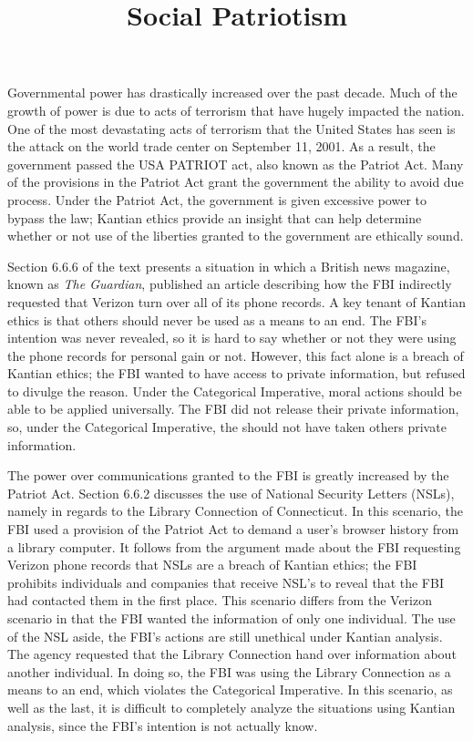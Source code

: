\documentclass{paper}
\title{Social Patriotism}
\begin{document}
\drafth{}
\inlinetitle
\begin{linenumbers}

Governmental power has drastically increased over the past decade. Much of the growth of power is due to acts of terrorism that have hugely impacted the nation. One of the most devastating acts of terrorism that the United States has seen is the attack on the world trade center on September 11, 2001. As a result, the government passed the USA PATRIOT act, also known as the Patriot Act. Many of the provisions in the Patriot Act grant the government the ability to avoid due process. Under the Patriot Act, the government is given excessive power to bypass the law; Kantian ethics provide an insight that can help determine whether or not use of the liberties granted to the government are ethically sound.

Section 6.6.6 of the text presents a situation in which a British news magazine, known as \textit{The Guardian}, published an article describing how the FBI indirectly requested that Verizon turn over all of its phone records. A key tenant of Kantian ethics is that others should never be used as a means to an end. The FBI's intention was never revealed, so it is hard to say whether or not they were using the phone records for personal gain or not. However, this fact alone is a breach of Kantian ethics; the FBI wanted to have access to private information, but refused to divulge the reason. Under the Categorical Imperative, moral actions should be able to be applied universally. The FBI did not release their private information, so, under the Categorical Imperative, the should not have taken others private information.

The power over communications granted to the FBI is greatly increased by the Patriot Act. Section 6.6.2 discusses the use of National Security Letters (NSLs), namely in regards to the Library Connection of Connecticut. In this scenario, the FBI used a provision of the Patriot Act to demand a user's browser history from a library computer. It follows from the argument made about the FBI requesting Verizon phone records that NSLs are a breach of Kantian ethics; the FBI prohibits individuals and companies that receive NSL's to reveal that the FBI had contacted them in the first place. This scenario differs from the Verizon scenario in that the FBI wanted the information of only one individual. The use of the NSL aside, the FBI's actions are still unethical under Kantian analysis. The agency requested that the Library Connection hand over information about another individual. In doing so, the FBI was using the Library Connection as a means to an end, which violates the Categorical Imperative. In this scenario, as well as the last, it is difficult to completely analyze the situations using Kantian analysis, since the FBI's intention is not actually know.


\end{linenumbers}
\end{document}

